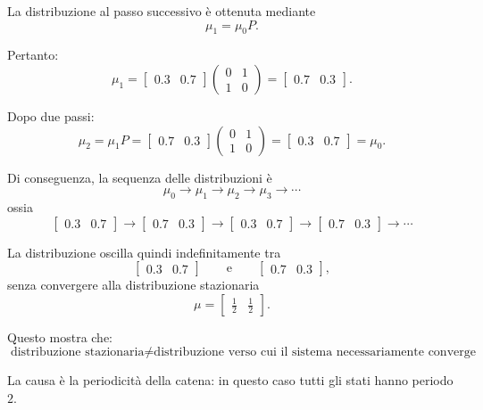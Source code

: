 La distribuzione al passo successivo è ottenuta mediante
\[
\mu_1=\mu_0P.
\]

Pertanto:
\[
\mu_1=
\begin{bmatrix}
0.3 & 0.7
\end{bmatrix}
\begin{pmatrix}
0&1\\
1&0
\end{pmatrix}
=
\begin{bmatrix}
0.7&0.3
\end{bmatrix}.
\]

Dopo due passi:
\[
\mu_2=\mu_1P
=
\begin{bmatrix}
0.7&0.3
\end{bmatrix}
\begin{pmatrix}
0&1\\
1&0
\end{pmatrix}
=
\begin{bmatrix}
0.3&0.7
\end{bmatrix}
=\mu_0.
\]

Di conseguenza, la sequenza delle distribuzioni è
\[
\mu_0
\rightarrow
\mu_1
\rightarrow
\mu_2
\rightarrow
\mu_3
\rightarrow\cdots
\]
ossia
\[
\begin{bmatrix}
0.3&0.7
\end{bmatrix}
\rightarrow
\begin{bmatrix}
0.7&0.3
\end{bmatrix}
\rightarrow
\begin{bmatrix}
0.3&0.7
\end{bmatrix}
\rightarrow
\begin{bmatrix}
0.7&0.3
\end{bmatrix}
\rightarrow\cdots
\]

La distribuzione oscilla quindi indefinitamente tra
\[
\begin{bmatrix}
0.3&0.7
\end{bmatrix}
\qquad\text{e}\qquad
\begin{bmatrix}
0.7&0.3
\end{bmatrix},
\]
senza convergere alla distribuzione stazionaria
\[
\mu=
\begin{bmatrix}
\frac12&\frac12
\end{bmatrix}.
\]

Questo mostra che:
\[
\boxed{
\text{distribuzione stazionaria}
\neq
\text{distribuzione verso cui il sistema necessariamente converge}
}
\]

La causa è la periodicità della catena: in questo caso tutti gli stati hanno
periodo $2$.

